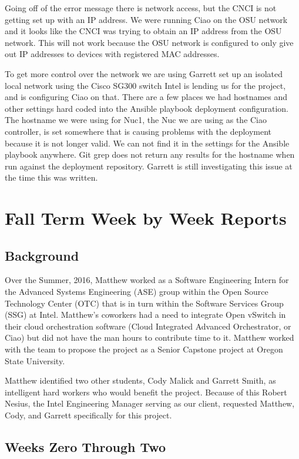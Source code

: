 \documentclass[10pt,onecolumn,journal,draftclsnofoot]{IEEEtran}
\begin{document}
Going off of the error message there is network access, but the CNCI is not
getting set up with an IP address.
We were running Ciao on the OSU network and it looks like the CNCI was trying
to obtain an IP address from the OSU network. This will not work because the
OSU network is configured to only give out IP addresses to devices with
registered MAC addresses.

To get more control over the network we are using Garrett set up an isolated
local network using the Cisco SG300 switch Intel is lending us for the project,
and is configuring Ciao on that. There are a few places we had hostnames and
other settings hard coded into the Ansible playbook deployment configuration.
The hostname we were using for Nuc1, the Nuc we are using as the Ciao
controller, is set somewhere that is causing problems with the deployment
because it is not longer valid. We can not find it in the settings for the 
Ansible playbook anywhere.
Git grep does not return any results for the hostname when run against the 
deployment repository.
Garrett is still investigating this issue at the time this was written.

\section{Fall Term Week by Week Reports}

\subsection{Background}

Over the Summer, 2016, Matthew worked as a Software Engineering Intern for the
Advanced Systems Engineering (ASE) group within the Open Source Technology
Center (OTC) that is in turn within the Software Services Group (SSG) at Intel.
Matthew's coworkers had a need to integrate Open vSwitch in their cloud
orchestration software (Cloud Integrated Advanced Orchestrator, or Ciao) but did
not have the man hours to contribute time to it. Matthew worked with the team to
propose the project as a Senior Capstone project at Oregon State University.

Matthew identified two other students, Cody Malick and Garrett Smith, as
intelligent hard workers who would benefit the project. Because of this Robert
Nesius, the Intel Engineering Manager serving as our client, requested Matthew,
Cody, and Garrett specifically for this project.

\subsection{Weeks Zero Through Two}
\end{document}
